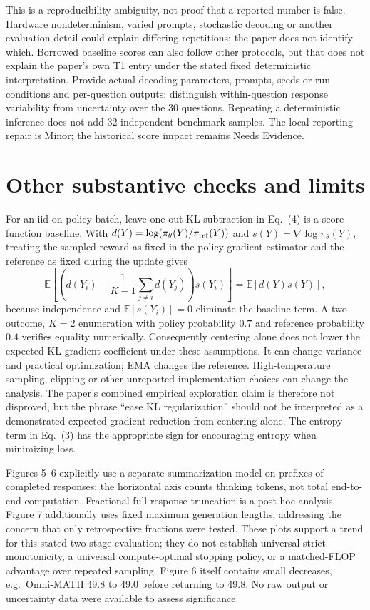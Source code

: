 \documentclass[10pt]{article}
\begin{document}
This is a reproducibility ambiguity, not proof that a reported number is false. Hardware nondeterminism, varied prompts, stochastic decoding or another evaluation detail could explain differing repetitions; the paper does not identify which. Borrowed baseline scores can also follow other protocols, but that does not explain the paper’s own T1 entry under the stated fixed deterministic interpretation. Provide actual decoding parameters, prompts, seeds or run conditions and per-question outputs; distinguish within-question response variability from uncertainty over the 30 questions. Repeating a deterministic inference does not add 32 independent benchmark samples. The local reporting repair is Minor; the historical score impact remains Needs Evidence.\par
\section*{Other substantive checks and limits}
For an iid on-policy batch, leave-one-out KL subtraction in Eq. (4) is a score-function baseline. With \(d(Y)=\log(\pi_\theta(Y)/\pi_{\rm ref}(Y))\) and \(s(Y)=\nabla\log\pi_\theta(Y)\), treating the sampled reward as fixed in the policy-gradient estimator and the reference as fixed during the update gives \[\mathbb E\!\left[\left(d(Y_i)-\frac1{K-1}\sum_{j\ne i}d(Y_j)\right)s(Y_i)\right]
 =\mathbb E[d(Y)s(Y)],\] because independence and \(\mathbb E[s(Y_i)]=0\) eliminate the baseline term. A two-outcome, \(K=2\) enumeration with policy probability \(0.7\) and reference probability \(0.4\) verifies equality numerically. Consequently centering alone does not lower the expected KL-gradient coefficient under these assumptions. It can change variance and practical optimization; EMA changes the reference. High-temperature sampling, clipping or other unreported implementation choices can change the analysis. The paper’s combined empirical exploration claim is therefore not disproved, but the phrase “ease KL regularization” should not be interpreted as a demonstrated expected-gradient reduction from centering alone. The entropy term in Eq. (3) has the appropriate sign for encouraging entropy when minimizing loss.\par
Figures 5–6 explicitly use a separate summarization model on prefixes of completed responses; the horizontal axis counts thinking tokens, not total end-to-end computation. Fractional full-response truncation is a post-hoc analysis. Figure 7 additionally uses fixed maximum generation lengths, addressing the concern that only retrospective fractions were tested. These plots support a trend for this stated two-stage evaluation; they do not establish universal strict monotonicity, a universal compute-optimal stopping policy, or a matched-FLOP advantage over repeated sampling. Figure 6 itself contains small decreases, e.g. Omni-MATH 49.8 to 49.0 before returning to 49.8. No raw output or uncertainty data were available to assess significance.\par
\end{document}
